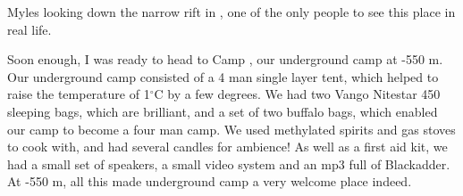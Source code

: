 


\begin{marginfigure}
\checkoddpage \ifoddpage \forcerectofloat \else \forceversofloat \fi
\centering
 \caption{Myles looking down the narrow rift in \protect{}, one of the only  people to see this place in real life. }
 \label{stalemate rift}
\end{marginfigure}


Soon enough, I was ready to head to Camp , our underground camp at -550 m. Our underground camp consisted of a 4 man single layer tent, which helped to raise the temperature of 1$^{\circ}$C by a few degrees. We had two Vango Nitestar 450 sleeping bags, which are brilliant, and a set of
two buffalo bags, which enabled our camp to become a four man camp. We used methylated spirits
and gas stoves to cook with, and had several candles for ambience! As well as a first aid kit, we had
a small set of speakers, a small video system and an mp3 full of Blackadder. At -550 m, all this made
underground camp a very welcome place indeed.


